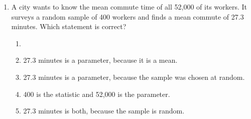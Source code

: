 \documentclass[12pt]{article}
\begin{document}
\begin{enumerate}[leftmargin=1.9em, itemsep=0.13in]
        \vspace{3pt}
        {\centering
        \par}
        \vspace{1pt}

        Which statement is true?\hfill{}\rule[-0.2in]{0pt}{0.48in}
        \begin{enumerate}[label=\textbf{(\Alph*)}, leftmargin=2.2em, itemsep=2pt]
          \item More days had 34 to 60 customers than 18 to 22, because that whisker is longer.
          \item On about half of the days, the truck served fewer than 18 customers.
          \item {}
          \item The mean number of customers per day was 22.
          \item The truck never served more than 34 customers in a day.
        \end{enumerate}

  \boxguard[11]
  \item A city wants to know the mean commute time of all 52{,}000 of its workers. It surveys
        a random sample of 400 workers and finds a mean commute of 27.3 minutes. Which
        statement is correct?
        \begin{enumerate}[label=\textbf{(\Alph*)}, leftmargin=2.2em, itemsep=2pt]
          \item {}\\
          \item 27.3 minutes is a parameter, because it is a mean.
          \item 27.3 minutes is a parameter, because the sample was chosen at random.
          \item 400 is the statistic and 52{,}000 is the parameter.
          \item 27.3 minutes is both, because the sample is random.\hfill{}\rule[-0.2in]{0pt}{0.48in}
        \end{enumerate}


\end{enumerate}
\end{document}
